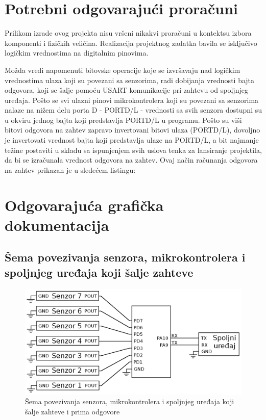 \documentclass[a4paper, 12pt, oneside, titlepage]{article}
\begin{document}
    \section{Potrebni odgovarajući proračuni}
    Prilikom izrade ovog projekta nisu vršeni nikakvi proračuni u kontektsu izbora komponenti i fizičkih veličina. Realizacija projektnog zadatka bavila se isključivo logičkim vrednostima
    na digitalnim pinovima.
    
    Možda vredi napomenuti bitovske operacije koje se izvršavaju nad logičkim vrednostima ulaza koji su povezani sa senzorima, radi dobijanja vrednosti bajta odgovora, koji se šalje pomoću
    USART komunikacije pri zahtevu od spoljnjeg uređaja. Pošto se svi ulazni pinovi mikrokontrolera koji su povezani sa senzorima nalaze na nižem delu porta D - PORTD/L - vrednosti sa
    svih senzora dostupni su u okviru jednog bajta koji predstavlja PORTD/L u programu. Pošto su viši bitovi odgovora na zahtev zapravo invertovani bitovi ulaza (PORTD/L), dovoljno je
    invertovati vrednost bajta koji predstavlja ulaze na PORTD/L, a bit najmanje težine postaviti u skladu sa ispunjenjem svih uslova tenka za lansiranje projektila, da bi se izračunala
    vrednost odgovora na zahtev. Ovaj način računanja odgovora na zahtev prikazan je u sledećem listingu:
    
    
    \section{Odgovarajuća grafička dokumentacija}
      \subsection{Šema povezivanja senzora, mikrokontrolera i spoljnjeg uređaja koji šalje zahteve}
      \begin{figure}[H]
        \centering
        \includegraphics[width=\textwidth]{slike/povezivanje}
        \caption{Šema povezivanja senzora, mikrokontrolera i spoljnjeg uređaja koji šalje zahteve i prima odgovore}
        \label{fig:povezivanje} %
      \end{figure}
      
\end{document}

